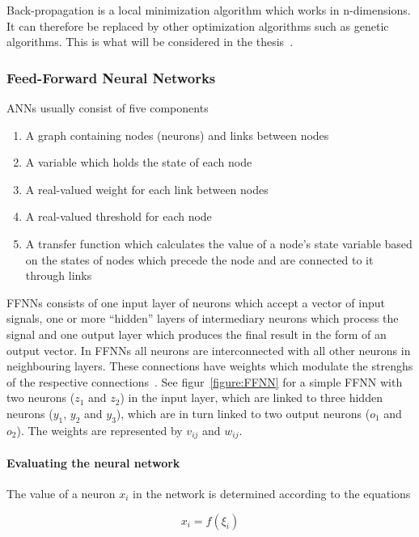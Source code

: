 Back-propagation is a local minimization algorithm which works in n-dimensions. It can therefore be replaced by other optimization algorithms such as genetic algorithms. This is what will be considered in the thesis~\cite{gardner1998artificial}.

\subsubsection{Feed-Forward Neural Networks}

ANNs usually consist of five components

\begin{enumerate}
  \item A graph containing nodes (neurons) and links between nodes
  \item A variable which holds the state of each node
  \item A real-valued weight for each link between nodes
  \item A real-valued threshold for each node
  \item A transfer function which calculates the value of a node's state variable based on the states of nodes which precede the node and are connected to it through links
\end{enumerate}

FFNNs consists of one input layer of neurons which accept a vector of input signals, one or more ``hidden'' layers of intermediary neurons which process the signal and one output layer which produces the final result in the form of an output vector. In FFNNs all neurons are interconnected with all other neurons in neighbouring layers. These connections have weights which modulate the strenghs of the respective connections~\cite{montana1989training}. See figur~\ref{figure:FFNN} for a simple FFNN with two neurons ($z_1$ and $z_2$) in the input layer, which are linked to three hidden neurons ($y_1$, $y_2$ and $y_3$), which are in turn linked to two output neurons ($o_1$ and $o_2$). The weights are represented by $v_{ij}$ and $w_{ij}$.

\paragraph{Evaluating the neural network}

The value of a neuron $x_i$ in the network is determined according to the equations

\begin{equation}
  x_i = f(\xi_i)
  \label{neuron}
\end{equation}

